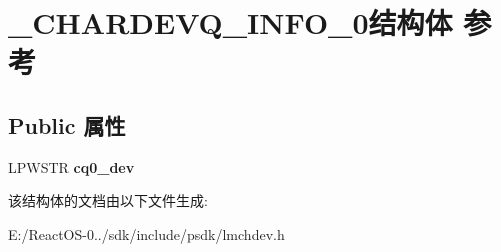 \hypertarget{struct___c_h_a_r_d_e_v_q___i_n_f_o__0}{}\section{\+\_\+\+C\+H\+A\+R\+D\+E\+V\+Q\+\_\+\+I\+N\+F\+O\+\_\+0结构体 参考}
\label{struct___c_h_a_r_d_e_v_q___i_n_f_o__0}
\subsection*{Public 属性}
\begin{DoxyCompactItemize}
\item 
\mbox{\label{struct___c_h_a_r_d_e_v_q___i_n_f_o__0_aa54a6f501c7e1f5726ff39da185effcf}} 
L\+P\+W\+S\+TR {\bfseries cq0\+\_\+dev}
\end{DoxyCompactItemize}


该结构体的文档由以下文件生成\+:\begin{DoxyCompactItemize}
\item 
E\+:/\+React\+O\+S-\/0../sdk/include/psdk/lmchdev.\+h\end{DoxyCompactItemize}
